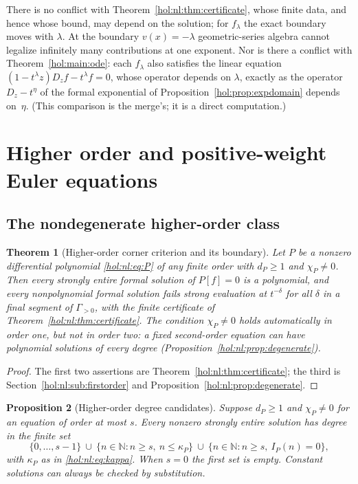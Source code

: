 \documentclass[11pt]{article}
\numberwithin{equation}{section}
\newtheorem{theorem}{Theorem}[section]
\newtheorem{proposition}[theorem]{Proposition}
\theoremstyle{definition}
\theoremstyle{remark}
\newcommand{\N}{\mathbb N}
\begin{document}
There is no conflict with Theorem~\ref{hol:nl:thm:certificate}, whose
finite data, and hence whose bound, may depend on the solution; for
$f_\lambda$ the exact boundary moves with $\lambda$. At the boundary
$v(x)=-\lambda$ geometric-series algebra cannot legalize infinitely many
contributions at one exponent. Nor is there a conflict with
Theorem~\ref{hol:main:ode}: each $f_\lambda$ also satisfies the linear
equation $(1-t^\lambda z)D_zf-t^\lambda f=0$, whose operator depends on
$\lambda$, exactly as the operator $D_z-t^\eta$ of the formal exponential of
Proposition~\ref{hol:prop:expdomain} depends on~$\eta$. (This comparison is
the merge's; it is a direct computation.)

\section{Higher order and positive-weight Euler equations}
\label{hol:nl:sec:higher}

\subsection{The nondegenerate higher-order class}

\begin{theorem}[Higher-order corner criterion and its boundary]
\label{hol:nl:thm:corner}
Let $P$ be a nonzero differential polynomial \eqref{hol:nl:eq:P} of any finite
order with $d_P\ge1$ and $\chi_P\ne0$. Then every strongly entire formal
solution of $P[f]=0$ is a polynomial, and every nonpolynomial formal solution
fails strong evaluation at $t^{-\delta}$ for all $\delta$ in a final segment
of $\Gamma_{>0}$, with the finite certificate of
Theorem~\ref{hol:nl:thm:certificate}. The condition $\chi_P\ne0$ holds
automatically in order one, but not in order two: a fixed second-order
equation can have polynomial solutions of every degree
(Proposition~\ref{hol:nl:prop:degenerate}).
\end{theorem}

\begin{proof}
The first two assertions are Theorem~\ref{hol:nl:thm:certificate}; the third
is Section~\ref{hol:nl:sub:firstorder} and
Proposition~\ref{hol:nl:prop:degenerate}.
\end{proof}

\begin{proposition}[Higher-order degree candidates]
\label{hol:nl:prop:higherdegrees}
Suppose $d_P\ge1$ and $\chi_P\ne0$ for an equation of order at most $s$. Every
nonzero strongly entire solution has degree in the finite set
\[
 \{0,\ldots,s-1\}\ \cup\ \{n\in\N:n\ge s,\ n\le\kappa_P\}\ \cup\
 \{n\in\N:n\ge s,\ I_P(n)=0\},
\]
with $\kappa_P$ as in \eqref{hol:nl:eq:kappa}. When $s=0$ the first set is
empty. Constant solutions can always be checked by substitution.
\end{proposition}
\end{document}
